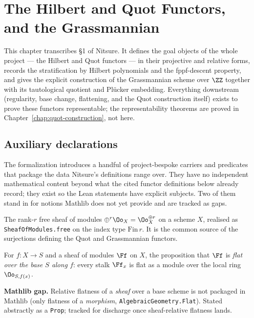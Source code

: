 \chapter{The Hilbert and Quot Functors, and the Grassmannian}
\label{chap:functors}

This chapter transcribes \S1 of Nitsure. It defines the goal objects of the whole
project --- the Hilbert and Quot functors --- in their projective and relative
forms, records the stratification by Hilbert polynomials and the fppf-descent
property, and gives the explicit construction of the Grassmannian scheme over
$\ZZ$ together with its tautological quotient and Pl\"ucker embedding. Everything
downstream (regularity, base change, flattening, and the Quot construction
itself) exists to prove these functors representable; the representability
theorems are proved in Chapter~\ref{chap:quot-construction}, not here.

\section{Auxiliary declarations}

The formalization introduces a handful of project-bespoke carriers and
predicates that package the data Nitsure's definitions range over. They have no
independent mathematical content beyond what the cited functor definitions below
already record; they exist so the Lean statements have explicit subjects. Two of
them stand in for notions Mathlib does not yet provide and are tracked as gaps.

\begin{definition}
  \label{def:free-module}
  The rank-$r$ free sheaf of modules $\oplus^r\Oo_X = \Oo_X^{\oplus r}$ on a
  scheme $X$, realised as \texttt{SheafOfModules.free} on the index type
  $\mathrm{Fin}\,r$. It is the common source of the surjections defining the Quot
  and Grassmannian functors.
\end{definition}

\begin{definition}
  \label{def:sheaf-flat-over}
  For $f\colon X\to S$ and a sheaf of modules $\Ff$ on $X$, the proposition that
  $\Ff$ is \emph{flat over the base $S$ along $f$}: every stalk $\Ff_x$ is flat
  as a module over the local ring $\Oo_{S,f(x)}$.

  \textbf{Mathlib gap.} Relative flatness of a \emph{sheaf} over a base scheme is
  not packaged in Mathlib (only flatness of a \emph{morphism},
  \texttt{AlgebraicGeometry.Flat}). Stated abstractly as a \texttt{Prop}; tracked
  for discharge once sheaf-relative flatness lands.
\end{definition}

